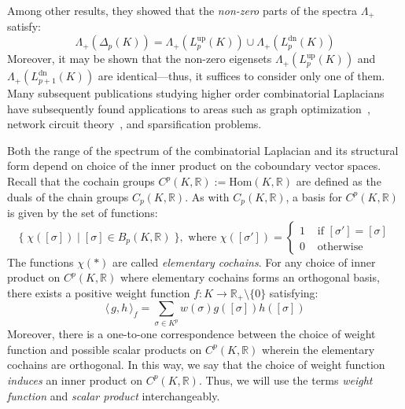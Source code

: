 \documentclass[12pt]{article}
\numberwithin{equation}{section}
\newcommand{\+}{%
	\raisebox{0.18ex}{\scaleobj{0.55}{+}}
}
\theoremstyle{definition}
\begin{document}
Among other results, they showed that the \emph{non-zero} parts of the spectra $\Lambda_+$ satisfy:
\begin{equation}
	\Lambda_+(\Delta_p(K)) = \Lambda_+(L_p^{\text{up}}(K)) \cup \Lambda_+(L_p^{\text{dn}}(K))
\end{equation}
Moreover, it may be shown that the non-zero eigensets $\Lambda_+(L_p^{\text{up}}(K))$ and $\Lambda_+(L_{p+1}^{\text{dn}}(K))$ are identical---thus, it suffices to consider only one of them. 
Many subsequent publications studying higher order combinatorial Laplacians have subsequently found applications to areas such as graph optimization~\cite{}, network circuit theory~\cite{}, and sparsification problems. 

Both the range of the spectrum of the combinatorial Laplacian and its structural form depend on choice of the inner product on the coboundary vector spaces. Recall that the cochain groups $C^p(K, \mathbb{R}) := \mathrm{Hom}(K, \mathbb{R})$ are defined as the duals of the chain groups $C_p(K, \mathbb{R})$. 
As with $C_p(K, \mathbb{R})$, a basis for $C^p(K, \mathbb{R})$ is given by the set of functions:
\begin{equation}
	\{ \; \chi([\sigma]) \mid [\sigma] \in B_p(K, \mathbb{R}) \; \}, \text{ where } \chi([\sigma']) = \begin{cases}
		1 & \text{ if } [\sigma'] = [\sigma] \\
		0 & \text{ otherwise }
		\end{cases}
\end{equation}
The functions $\chi(\ast)$ are called \emph{elementary cochains}. For any choice of inner product on $C^p(K, \mathbb{R})$ where elementary cochains forms an orthogonal basis, there exists a positive weight function $f: K \to \mathbb{R}_+ \setminus \{0\}$ satisfying: 
\begin{equation}
	\langle \, g, h \, \rangle_{f} = \sum\limits_{\sigma \in K^p} w(\sigma) g([\sigma]) h([\sigma])
\end{equation}
Moreover, there is a one-to-one correspondence between the choice of weight function and possible scalar products on $C^p(K, \mathbb{R})$ wherein the elementary cochains are orthogonal. In this way, we say that the choice of weight function \emph{induces} an inner product on $C^p(K, \mathbb{R})$.  Thus, we will use the terms \emph{weight function} and \emph{scalar product} interchangeably. 
\end{document}
